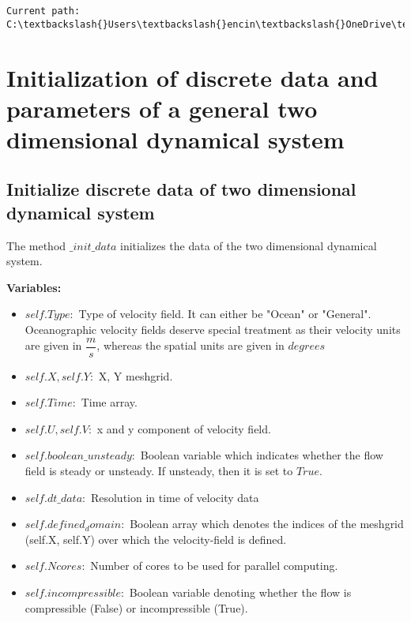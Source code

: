 \documentclass[11pt]{article}
\begin{document}
    \begin{Verbatim}[commandchars=\\\{\}]
Current path:  C:\textbackslash{}Users\textbackslash{}encin\textbackslash{}OneDrive\textbackslash{}Jupyter\_LCS\textbackslash{}2D\textbackslash{}src\textbackslash{}Gridded
    \end{Verbatim}
\section{Initialization of discrete data and parameters of a general two dimensional dynamical system}\subsection{Initialize discrete data of two dimensional dynamical system}The method $ \_init\_data $ initializes the data of the two dimensional dynamical system.

\textbf{Variables:}

\begin{itemize}
\item $self.Type: $ Type of velocity field. It can either be "Ocean" or "General". Oceanographic velocity fields deserve special treatment as their velocity units are given in $ \dfrac{m}{s} $, whereas the spatial units are given in $ degrees$ 
\item $ self.X, self.Y: $ X, Y meshgrid.
\item $ self.Time: $ Time array.
\item $ self.U, self.V: $ x and y component of velocity field.
\item $ self.boolean\_unsteady: $ Boolean variable which indicates whether the flow field is steady or unsteady. If unsteady, then it is set to $True$.
\item $ self.dt\_data: $ Resolution in time of velocity data
\item $ self.defined_domain: $ Boolean array which denotes the indices of the meshgrid (self.X, self.Y) over which the velocity-field is defined.
\item $ self.Ncores: $ Number of cores to be used for parallel computing.
\item $ self.incompressible: $ Boolean variable denoting whether the flow is compressible (False) or incompressible (True).
\end{itemize}
\end{document}
